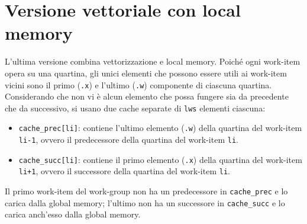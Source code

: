 \section{Versione vettoriale con local memory}\label{sec:opencl_lmem_smooth_v4lmem}

L'ultima versione combina vettorizzazione e local memory. Poiché ogni work-item opera su una quartina, gli unici elementi che possono essere utili ai work-item vicini sono il primo (\texttt{.x}) e l'ultimo (\texttt{.w}) componente di ciascuna quartina.
Considerando che non vi è alcun elemento che possa fungere sia da precedente che da successivo, si usano due cache separate di \texttt{lws} elementi ciascuna:

\begin{itemize}
    \item \texttt{cache\_prec[li]}: contiene l'ultimo elemento (\texttt{.w}) della quartina del work-item \texttt{li-1}, ovvero il predecessore della quartina del work-item \texttt{li}.
    \item \texttt{cache\_succ[li]}: contiene il primo elemento (\texttt{.x}) della quartina del work-item \texttt{li+1}, ovvero il successore della quartina del work-item \texttt{li}.
\end{itemize}

Il primo work-item del work-group non ha un predecessore in \texttt{cache\_prec} e lo carica dalla global memory; l'ultimo non ha un successore in \texttt{cache\_succ} e lo carica anch'esso dalla global memory.

